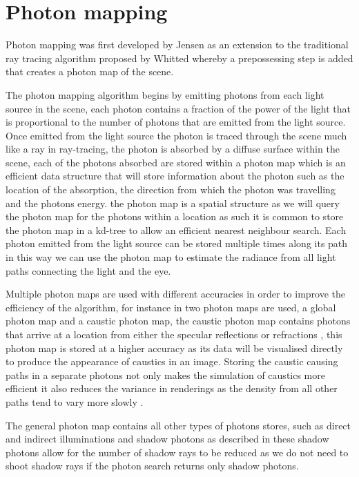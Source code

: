 \section{Photon mapping}
Photon mapping was first developed by Jensen \cite{Jensen95b} as an extension to the traditional ray
tracing algorithm proposed by Whitted \cite{whitted79a} whereby a prepossessing step is added that
creates a photon map of the scene.

The photon mapping algorithm begins by emitting photons from each light source in the scene,
each photon contains a fraction of the power of the light that is proportional to the number
of photons that are emitted from the light source. Once emitted from the light source the
photon is traced through the scene much like a ray in ray-tracing, 
the photon is absorbed by a diffuse surface within the scene, each of the photons absorbed are stored within a photon map
which is an efficient data structure that will store information about the photon such as the
location of the absorption, the direction from which the photon was travelling and the photons
energy. the photon map is a spatial structure as we will query the photon map for the photons
within a location as such it is common to store the photon map in a kd-tree to allow an efficient
nearest neighbour search. Each photon emitted from the light source can be stored multiple times
along its path in this way we can use the photon map to estimate the radiance from all light
paths connecting the light and the eye.

Multiple photon maps are used with different accuracies in order to
improve the efficiency of the algorithm, for instance in \cite{Jensen96a} two photon maps are used, a global photon
map and a caustic photon map, the caustic photon map contains photons that arrive at a location from
either the specular reflections or refractions , this photon map is stored at a higher
accuracy as its data will be visualised directly to produce the appearance of caustics in an image.
Storing the caustic causing paths in a separate photons not only makes the simulation of caustics
more efficient it also reduces the variance in renderings as the density from all other paths
tend to vary more slowly \cite{JensenBook}.

The general photon map contains all other types of photons stores, such as direct and indirect
illuminations and shadow photons as described in \cite{Jensen95c,Jensen96a} these shadow photons
allow for the number of shadow rays to be reduced as we do not need to shoot shadow rays if the
photon search returns only shadow photons.

